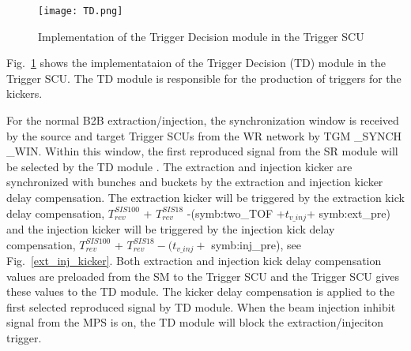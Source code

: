 %
 \begin{figure}[!htb]
   \centering   
   \texttt{[image: TD.png]}
   \caption{Implementation of the Trigger Decision module in the Trigger SCU}
   \label{TD}
\end{figure}
Fig.~\ref{TD} shows the implementataion of the Trigger Decision (TD) module in the Trigger SCU.  The TD module is responsible for the production of triggers for the kickers. 

For the normal B2B extraction/injection, the synchronization window is received by the source and target Trigger SCUs from the WR network by TGM \_SYNCH \_WIN. Within this window, the first reproduced signal from the SR module will be selected by the \gls{TD} module . The extraction and injection kicker are synchronized with bunches and buckets by the extraction and injection kicker delay compensation. The extraction kicker will be triggered by the extraction kick delay compensation, $T_{\mathit{rev}}^{\mathit{SIS100}}$ + $T_{\mathit{rev}}^{\mathit{SIS18}}$ -(\gls{symb:two_TOF} +$ t_{v\_inj}$+ \gls{symb:ext_pre}) and the injection kicker will be triggered by the injection kick delay compensation, $T_{\mathit{rev}}^{\mathit{SIS100}}$ + $T_{\mathit{rev}}^{\mathit{SIS18}} - (t_{v\_inj}+$ \gls{symb:inj_pre}), see Fig.~\ref{ext_inj_kicker}. Both extraction and injection kick delay compensation values are preloaded from the SM to the Trigger SCU and the Trigger SCU gives these values to the TD module. The kicker delay compensation is applied to the first selected reproduced signal by TD module. When the beam injection inhibit signal from the MPS is on, the TD module will block the extraction/injeciton trigger.


